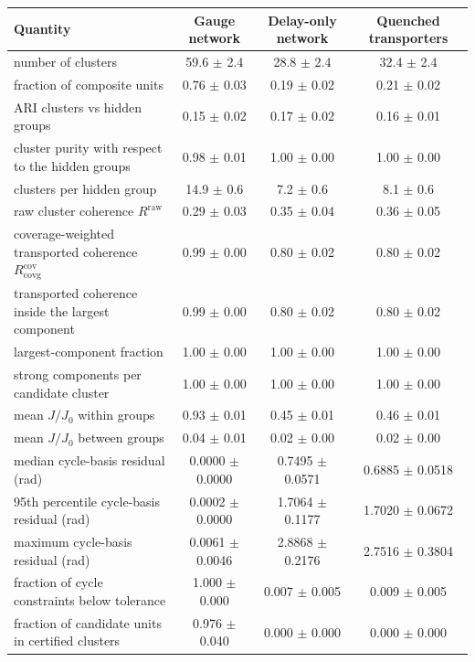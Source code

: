 \begin{tabular}{@{}lccc@{}}
\toprule
Quantity & Gauge network & Delay-only network & Quenched transporters \\
\midrule
number of clusters & 59.6 $\pm$ 2.4 & 28.8 $\pm$ 2.4 & 32.4 $\pm$ 2.4 \\
fraction of composite units & 0.76 $\pm$ 0.03 & 0.19 $\pm$ 0.02 & 0.21 $\pm$ 0.02 \\
ARI clusters vs hidden groups & 0.15 $\pm$ 0.02 & 0.17 $\pm$ 0.02 & 0.16 $\pm$ 0.01 \\
cluster purity with respect to the hidden groups & 0.98 $\pm$ 0.01 & 1.00 $\pm$ 0.00 & 1.00 $\pm$ 0.00 \\
clusters per hidden group & 14.9 $\pm$ 0.6 & 7.2 $\pm$ 0.6 & 8.1 $\pm$ 0.6 \\
raw cluster coherence $R^{\mathrm{raw}}$ & 0.29 $\pm$ 0.03 & 0.35 $\pm$ 0.04 & 0.36 $\pm$ 0.05 \\
coverage-weighted transported coherence $R^{\mathrm{cov}}_{\mathrm{covg}}$ & 0.99 $\pm$ 0.00 & 0.80 $\pm$ 0.02 & 0.80 $\pm$ 0.02 \\
transported coherence inside the largest component & 0.99 $\pm$ 0.00 & 0.80 $\pm$ 0.02 & 0.80 $\pm$ 0.02 \\
largest-component fraction & 1.00 $\pm$ 0.00 & 1.00 $\pm$ 0.00 & 1.00 $\pm$ 0.00 \\
strong components per candidate cluster & 1.00 $\pm$ 0.00 & 1.00 $\pm$ 0.00 & 1.00 $\pm$ 0.00 \\
mean $J/J_0$ within groups & 0.93 $\pm$ 0.01 & 0.45 $\pm$ 0.01 & 0.46 $\pm$ 0.01 \\
mean $J/J_0$ between groups & 0.04 $\pm$ 0.01 & 0.02 $\pm$ 0.00 & 0.02 $\pm$ 0.00 \\
median cycle-basis residual (rad) & 0.0000 $\pm$ 0.0000 & 0.7495 $\pm$ 0.0571 & 0.6885 $\pm$ 0.0518 \\
95th percentile cycle-basis residual (rad) & 0.0002 $\pm$ 0.0000 & 1.7064 $\pm$ 0.1177 & 1.7020 $\pm$ 0.0672 \\
maximum cycle-basis residual (rad) & 0.0061 $\pm$ 0.0046 & 2.8868 $\pm$ 0.2176 & 2.7516 $\pm$ 0.3804 \\
fraction of cycle constraints below tolerance & 1.000 $\pm$ 0.000 & 0.007 $\pm$ 0.005 & 0.009 $\pm$ 0.005 \\
fraction of candidate units in certified clusters & 0.976 $\pm$ 0.040 & 0.000 $\pm$ 0.000 & 0.000 $\pm$ 0.000 \\

\end{tabular}
